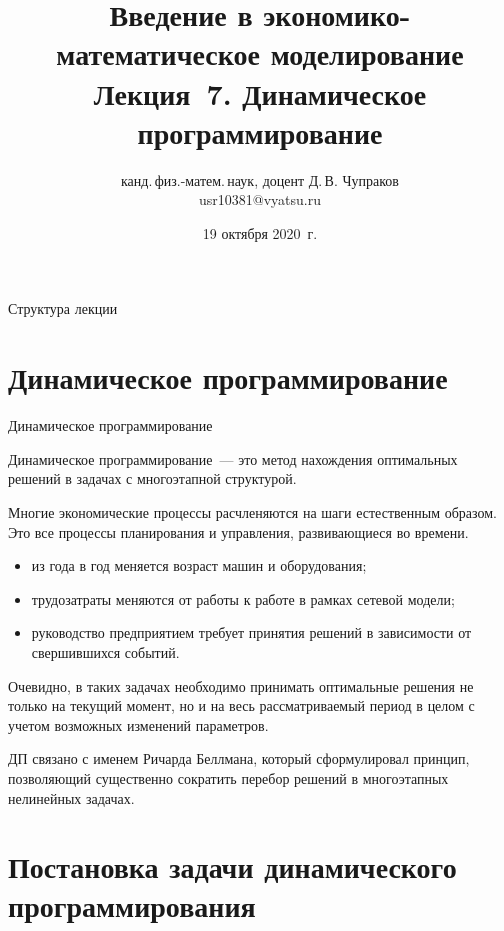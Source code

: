 \documentclass[unicode,11pt,notheorems,xcolor=table]{beamer}
\author[Д.\,В. Чупраков]{канд.\,физ.-матем.\,наук, доцент Д.\,В. Чупраков\\[6pt] usr10381@vyatsu.ru}
\institute[ВятГУ]{ФГБОУ ВО Вятский государственный университет}
\title[Лекция~7. Динамическое программирование]{
	Введение в экономико-математическое моделирование\\[12pt]
	Лекция~7. Динамическое программирование}
\date{19 октября 2020~г.}
\begin{document}
\maketitle

\begin{frame}{Структура лекции}
	\tableofcontents
\end{frame}



\section{Динамическое программирование}
\begin{frame}{Динамическое программирование}{}

	\alert{Динамическое программирование}~--- это метод нахождения оптимальных решений в задачах с \alert{многоэтапной структурой}. 


	\medskip
	
	Многие экономические процессы расчленяются на шаги естественным образом. Это все процессы планирования и управления, развивающиеся во времени.
	\begin{itemize}
		\item из года в год меняется возраст машин и оборудования;
		\item трудозатраты меняются от работы к работе в рамках сетевой модели;
		\item руководство предприятием требует принятия решений в зависимости от свершившихся событий. 
	\end{itemize}

 	Очевидно, в таких задачах необходимо принимать оптимальные решения не только на текущий момент,  но и на весь рассматриваемый период в целом с учетом возможных изменений параметров. 
 
	\medskip
     ДП связано с именем Ричарда Беллмана, который сформулировал принцип, позволяющий существенно сократить перебор решений в многоэтапных нелинейных задачах. 
\end{frame}



\section{Постановка задачи динамического программирования}
\end{document}
